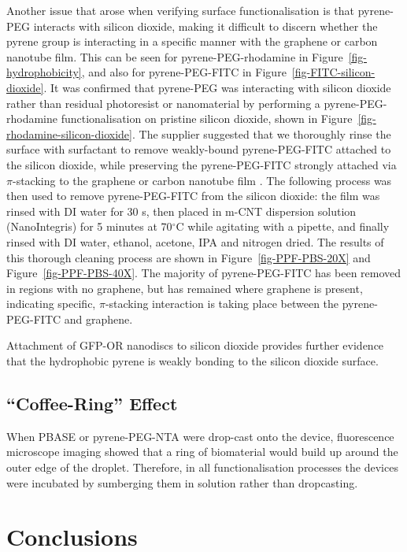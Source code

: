\documentclass[
  a4paper,
]{scrbook}
\begin{document}
Another issue that arose when verifying surface functionalisation is
that pyrene-PEG interacts with silicon dioxide, making it difficult to
discern whether the pyrene group is interacting in a specific manner
with the graphene or carbon nanotube film. This can be seen for
pyrene-PEG-rhodamine in Figure~\ref{fig-hydrophobicity}, and also for
pyrene-PEG-FITC in Figure~\ref{fig-FITC-silicon-dioxide}. It was
confirmed that pyrene-PEG was interacting with silicon dioxide rather
than residual photoresist or nanomaterial by performing a
pyrene-PEG-rhodamine functionalisation on pristine silicon dioxide,
shown in Figure~\ref{fig-rhodamine-silicon-dioxide}. The supplier
suggested that we thoroughly rinse the surface with surfactant to remove
weakly-bound pyrene-PEG-FITC attached to the silicon dioxide, while
preserving the pyrene-PEG-FITC strongly attached via \(\pi\)-stacking to
the graphene or carbon nanotube film \autocite{CreativePEGworks2022}.
The following process was then used to remove pyrene-PEG-FITC from the
silicon dioxide: the film was rinsed with DI water for 30 s, then placed
in m-CNT dispersion solution (NanoIntegris) for 5 minutes at
70\(^\circ\)C while agitating with a pipette, and finally rinsed with DI
water, ethanol, acetone, IPA and nitrogen dried. The results of this
thorough cleaning process are shown in Figure~\ref{fig-PPF-PBS-20X} and
Figure~\ref{fig-PPF-PBS-40X}. The majority of pyrene-PEG-FITC has been
removed in regions with no graphene, but has remained where graphene is
present, indicating specific, \(\pi\)-stacking interaction is taking
place between the pyrene-PEG-FITC and graphene.

Attachment of GFP-OR nanodiscs to silicon dioxide provides further
evidence that the hydrophobic pyrene is weakly bonding to the silicon
dioxide surface.

\hypertarget{sec-coffee-ring}{%
\subsection{``Coffee-Ring'' Effect}\label{sec-coffee-ring}}

When PBASE or pyrene-PEG-NTA were drop-cast onto the device,
fluorescence microscope imaging showed that a ring of biomaterial would
build up around the outer edge of the droplet. Therefore, in all
functionalisation processes the devices were incubated by sumberging
them in solution rather than dropcasting.

\hypertarget{sec-conclusions}{%
\section{Conclusions}\label{sec-conclusions}}
\end{document}
